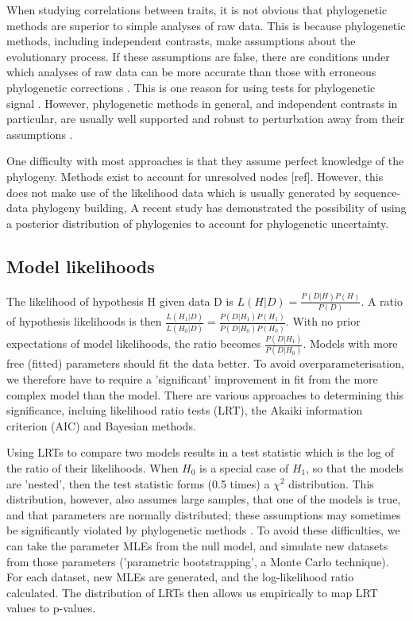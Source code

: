 \documentclass[12pt]{article}
\begin{document}
When studying correlations between traits, it is not obvious that phylogenetic methods are superior to simple analyses of raw data. This is because phylogenetic methods, including independent contrasts, make assumptions about the evolutionary process. If these assumptions are false, there are conditions under which analyses of raw data can be more accurate than those with erroneous phylogenetic corrections \citep{price_correlated_1997,harvey_comparative_2000}. This is one reason for using tests for phylogenetic signal \citep{pagel_inferring_1997,bjorklund_are_1997}. However, phylogenetic methods in general, and independent contrasts in particular, are usually well supported and robust to perturbation away from their assumptions \citep{harvey_phylogenetic_1998,martins_phylogenies_1997,diaz-uriarte_testing_1996}.

One difficulty with most approaches is that they assume perfect knowledge of the phylogeny. Methods exist to account for unresolved nodes [ref]. However, this does not make use of the likelihood data which is usually generated by sequence-data phylogeny building, A recent study \citep{blackburn_adaptive_2013} has demonstrated the possibility of using a posterior distribution of phylogenies to account for phylogenetic uncertainty.

\subsection{Model likelihoods}

The likelihood of hypothesis H given data D is $L(H|D) = \frac{P(D|H) P(H)}{P(D)}$. A ratio of hypothesis likelihoods is then $\frac{L(H_1|D)}{L(H_0|D)} = \frac{P(D|H_1)P(H_1)}{P(D|H_0)P(H_0)}$. With no prior expectations of model likelihoods, the ratio becomes $\frac{P(D|H_1)}{P(D|H_0)}$. Models with more free (fitted) parameters should fit the data better. To avoid overparameterisation, we therefore have to require a 'significant' improvement in fit from the more complex model than the model. There are various approaches to determining this significance, incluing likelihood ratio tests (LRT), the Akaiki information criterion (AIC) and Bayesian methods.

Using LRTs to compare two models results in a test statistic which is the log of the ratio of their likelihoods. When $H_0$ is a special case of $H_1$, so that the models are 'nested', then the test statistic forms (0.5 times) a $\chi ^2$ distribution. This distribution, however, also assumes large samples, that one of the models is true, and that parameters are normally distributed; these assumptions may sometimes be significantly violated by phylogenetic methods \citep{freckleton_seven_2009}. To avoid these difficulties, we can take the parameter MLEs from the null model, and simulate new datasets from those parameters ('parametric bootstrapping', a Monte Carlo technique). For each dataset, new MLEs are generated, and the log-likelihood ratio calculated. The distribution of LRTs then allows us empirically to map LRT values to p-values.
\end{document}
